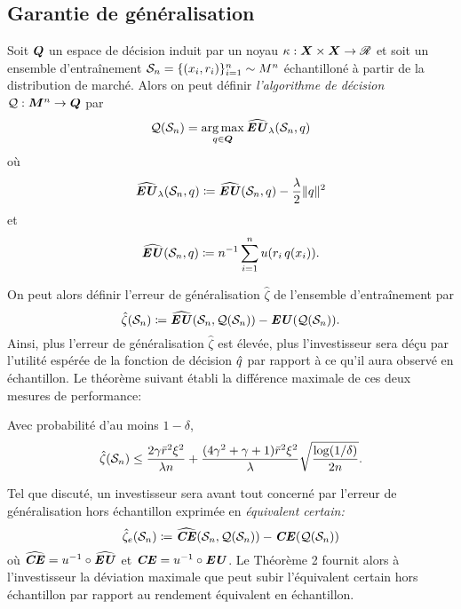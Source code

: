 \subsection{Garantie de généralisation}
\label{b:gen}


Soit $\Q$ un espace de décision induit par un noyau $\kappa : \X \times \X \to \Re$ et soit un ensemble
d'entraînement $\S_n = \{(x_i,r_i)\}_{i=1}^n \sim M^n$ échantilloné à partir de la
distribution de marché. Alors on peut définir \textit{l'algorithme de décision}
$\alg:\M^n \to \Q$ par
\begin{equation}
  \label{b:basic}
  \alg(\S_n) = \argmax_{q \in \Q} \hEU_\lambda(\S_n,q)
\end{equation}
où
\begin{equation}
  \hEU_\lambda(\S_n,q) \coloneq \hEU(\S_n,q) - \frac{\lambda}{2}\|q\|^2
\end{equation}
et
\begin{equation}
  \hEU(\S_n,q) \coloneq n^{-1}\sumi u(r_i\,q(x_i)).
\end{equation}

On peut alors définir l'erreur de généralisation $\hat\zeta$ de l'ensemble d'entraînement par
\begin{equation}
  \hat\zeta(\S_n) \coloneq \hEU(\S_n,\alg(\S_n)) - \EU(\alg(\S_n)).
\end{equation}
Ainsi, plus l'erreur de généralisation $\hat\zeta$ est élevée, plus l'investisseur sera déçu
par l'utilité espérée de la fonction de décision $\qh$ par rapport à ce qu'il aura observé
en échantillon. Le théorème suivant établi la différence maximale de ces deux mesures de
performance:

\begin{thm}
  \label{thm1}
  Avec probabilité d'au moins $1-\delta$, 
  \begin{equation}
    \hat\zeta(\S_n) \leq \frac{2\gamma\rmax^2\xi^2}{\lambda n} + \frac{(4\gamma^2 + \gamma +
      1)\rmax^2\xi^2}{\lambda}\sqrt{\frac{\log(1/\delta)}{2n}}.
  \end{equation}
\end{thm}

Tel que discuté, un investisseur sera avant tout concerné par l'erreur de généralisation
hors échantillon exprimée en \textit{équivalent certain:}
\begin{equation}
  \hat\zeta_e(\S_n) \coloneq \hCE(\S_n,\alg(\S_n)) - \CE(\alg(\S_n))
\end{equation}
où $\hCE = u^{-1} \circ \hEU$ et $\CE = u^{-1} \circ \EU$. Le Théorème 2 fournit alors à
l'investisseur la déviation maximale que peut subir l'équivalent certain hors échantillon
par rapport au rendement équivalent en échantillon.


